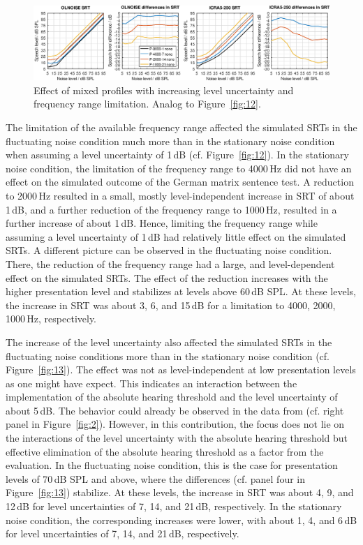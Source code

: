 \documentclass[10pt,a4paper,twocolumn]{article}
\begin{document}
%
\begin{figure}[h!]
	\centerline{\includegraphics[width=\textwidth]{images/SRTs-mixedprofiles}}
	\caption{Effect of mixed profiles with increasing level uncertainty and frequency range limitation. Analog to Figure~\ref{fig:12}.}
	\label{fig:15}
\end{figure}

The limitation of the available frequency range affected the simulated SRTs in the fluctuating noise condition much more than in the stationary noise condition when assuming a level uncertainty of 1\,dB (cf. Figure~\ref{fig:12}).
%
In the stationary noise condition, the limitation of the frequency range to 4000\,Hz did not have an effect on the simulated outcome of the German matrix sentence test.
%
A reduction to 2000\,Hz resulted in a small, mostly level-independent increase in SRT of about 1\,dB, and a further reduction of the frequency range to 1000\,Hz, resulted in a further increase of about 1\,dB.
%
Hence, limiting the frequency range while assuming a level uncertainty of 1\,dB had relatively little effect on the simulated SRTs.
%
A different picture can be observed in the fluctuating noise condition.
%
There, the reduction of the frequency range had a large, and level-dependent effect on the simulated SRTs.
%
The effect of the reduction increases with the higher presentation level and stabilizes at levels above 60\,dB SPL.
%
At these levels, the increase in SRT was about 3, 6, and 15\,dB for a limitation to 4000, 2000, 1000\,Hz, respectively.

The increase of the level uncertainty also affected the simulated SRTs in the fluctuating noise conditions more than in the stationary noise condition (cf. Figure~\ref{fig:13}).
%
The effect was not as level-independent at low presentation levels as one might have expect.
%
This indicates an interaction between the implementation of the absolute hearing threshold and the level uncertainty of about 5\,dB.
%
The behavior could already be observed in the data from \cite{kollmeier2016} (cf. right panel in Figure~\ref{fig:2}).
%
However, in this contribution, the focus does not lie on the interactions of the level uncertainty with the absolute hearing threshold but effective elimination of the absolute hearing threshold as a factor from the evaluation.
%
In the fluctuating noise condition, this is the case for presentation levels of 70\,dB SPL and above, where the differences (cf. panel four in Figure~\ref{fig:13}) stabilize.
%
At these levels, the increase in SRT was about 4, 9, and 12\,dB for level uncertainties of 7, 14, and 21\,dB, respectively.
%
In the stationary noise condition, the corresponding increases were lower, with about 1, 4, and 6\,dB for level uncertainties of 7, 14, and 21\,dB, respectively.
\end{document}
